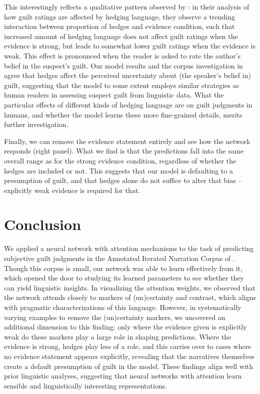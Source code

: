 \documentclass[11pt,a4paper]{article}
\begin{document}
This interestingly reflects a qualitative pattern observed by \citeauthor{Kreiss:2019}: in their analysis of how guilt ratings are affected by hedging language, they observe a trending interaction between proportion of hedges and evidence condition, such that increased amount of hedging language does not affect guilt ratings when the evidence is strong, but leads to somewhat lower guilt ratings when the evidence is weak. This effect is pronounced when the reader is asked to rate the author's belief in the suspect's guilt. Our model results and the corpus investigation in \citeauthor{Kreiss:2019} agree that hedges affect the perceived uncertainty about (the speaker's belief in) guilt, suggesting that the model to some extent employs similar strategies as human readers in assessing suspect guilt from linguistic data. What the particular effects of different kinds of hedging language are on guilt judgments in humans, and whether the model learns these more fine-grained details, merits further investigation.

Finally, we can remove the evidence statement entirely and see how the network responds (right panel). What we find is that the predictions fall into the same overall range as for the strong evidence condition, regardless of whether the hedges are included or not. This suggests that our model is defaulting to a presumption of guilt, and that hedges alone do not suffice to alter that bias -- explicitly weak evidence is required for that.


\section{Conclusion}

We applied a neural network with attention mechanisms to the task of predicting subjective guilt judgments in the Annotated Iterated Narration Corpus of \citet{Kreiss:2019}. Though this corpus is small, our network was able to learn effectively from it, which opened the door to studying its learned parameters to see whether they can yield linguistic insights. In visualizing the attention weights, we observed that the network attends closely to markers of (un)certainty and contrast, which aligns with pragmatic characterizations of this language. However, in systematically varying examples to remove the (un)certainty markers, we uncovered an additional dimension to this finding: only where the evidence given is explicitly weak do these markers play a large role in shaping predictions. Where the evidence is strong, hedges play less of a role, and this carries over to cases where no evidence statement appears explicitly, revealing that the narratives themselves create a default presumption of guilt in the model. These findings align well with prior linguistic analyses, suggesting that neural networks with attention learn sensible and linguistically interesting representations.
\end{document}
